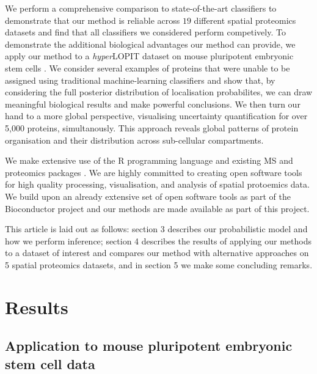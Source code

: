 \documentclass[12pt,english]{article}
\begin{document}
We perform a comprehensive comparison to state-of-the-art classifiers to demonstrate that our method is reliable across $19$ different spatial proteomics datasets and find that all classifiers we considered perform competively. To demonstrate
the additional biological advantages our method can provide, we apply our method to a \textit{hyper}LOPIT
dataset on mouse pluripotent embryonic stem cells \citep{hyper}. We consider several examples of proteins
that were unable to be assigned using traditional machine-learning classifiers and show that, by considering
the full posterior distribution of localisation probabilites, we can draw meaningful biological results and
make powerful conclusions. We then turn our hand to a more global perspective, visualising uncertainty quantification for over 5,000 proteins, simultanously. This approach reveals global patterns of protein organisation and their distribution across sub-cellular compartments.

We make extensive use of the R programming language \citep{R} and
existing MS and proteomics packages \citep{MSnbase:2012,
  pRoloc:2014}. We are highly committed to creating open software
tools for high quality processing, visualisation, and analysis of
spatial protoemics data.  We build upon an already extensive set of
open software tools \citep{pRoloc:2014} as part of the Bioconductor
project \citep{Bioconductor::2004, Huber::2015} and our methods are
made available as part of this project.

This article is laid out as follows: section 3 describes our probabilistic model and
how we perform inference; section 4 describes the results of applying our methods to a dataset of interest
and compares our method with alternative approaches on 5 spatial proteomics datasets, and in section 5 we make some
concluding remarks.

\section{Results}

\subsection{Application to mouse pluripotent embryonic stem cell data}
\end{document}
